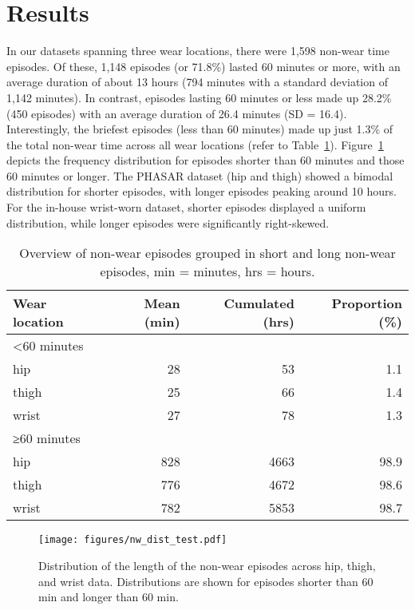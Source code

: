 \documentclass[
  10pt,
]{scrbook}
\begin{document}
\hypertarget{results-1}{%
\section{Results}\label{results-1}}

In our datasets spanning three wear locations, there were 1,598 non-wear
time episodes. Of these, 1,148 episodes (or 71.8\%) lasted 60 minutes or
more, with an average duration of about 13 hours (794 minutes with a
standard deviation of 1,142 minutes). In contrast, episodes lasting 60
minutes or less made up 28.2\% (450 episodes) with an average duration
of 26.4 minutes (SD = 16.4). Interestingly, the briefest episodes (less
than 60 minutes) made up just 1.3\% of the total non-wear time across
all wear locations (refer to Table~\ref{tbl-9}).
Figure~\ref{fig-paper2_nw_dists} depicts the frequency distribution for
episodes shorter than 60 minutes and those 60 minutes or longer. The
PHASAR dataset (hip and thigh) showed a bimodal distribution for shorter
episodes, with longer episodes peaking around 10 hours. For the in-house
wrist-worn dataset, shorter episodes displayed a uniform distribution,
while longer episodes were significantly right-skewed.

\begingroup

\footnotesize

\hypertarget{tbl-9}{}
\begin{longtable}{lrrr}
\caption{\label{tbl-9}Overview of non-wear episodes grouped in short and long non-wear
episodes, min = minutes, hrs = hours. }\tabularnewline

\toprule
Wear location & Mean (min) & Cumulated (hrs) & Proportion (\%) \\ 
\midrule
\multicolumn{4}{l}{<60 minutes} \\ 
\midrule
hip & 28 & 53 & 1.1 \\ 
thigh & 25 & 66 & 1.4 \\ 
wrist & 27 & 78 & 1.3 \\ 
\midrule
\multicolumn{4}{l}{≥60 minutes} \\ 
\midrule
hip & 828 & 4663 & 98.9 \\ 
thigh & 776 & 4672 & 98.6 \\ 
wrist & 782 & 5853 & 98.7 \\ 
\bottomrule
\end{longtable}

\endgroup

\begin{figure}

{\centering \texttt{[image: figures/nw\_dist\_test.pdf]}

}

\caption{\label{fig-paper2_nw_dists}Distribution of the length of the
non-wear episodes across hip, thigh, and wrist data. Distributions are
shown for episodes shorter than 60 min and longer than 60 min.}

\end{figure}
\end{document}
